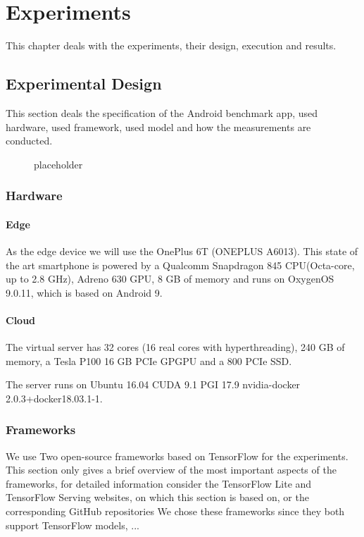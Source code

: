 \chapter{Experiments}
\label{chap:experiments}
This chapter deals with the experiments, their design, execution and results.

 
\section{Experimental Design}
This section deals the specification of the Android benchmark app, used hardware, used framework, used model and how the measurements are conducted. 
\begin{figure}[H]
\centering

\caption{placeholder}
\label{fig:expDesign}
\end{figure}


\subsection{Hardware}
\subsubsection{Edge}
\label{chap:hardwareEdge}
As the edge device we will use the OnePlus 6T (ONEPLUS A6013). This state of the art smartphone is powered by a Qualcomm Snapdragon 845 CPU(Octa-core, up to 2.8 GHz), Adreno 630 GPU, 8 GB of memory and runs on OxygenOS 9.0.11, which is based on Android 9.
\subsubsection{Cloud}
The virtual server has 32 cores (16 real cores with hyperthreading), 240 GB of memory, a Tesla P100 16 GB PCIe GPGPU and a 800 PCIe SSD.

The server runs on Ubuntu 16.04 CUDA 9.1 PGI 17.9 nvidia-docker 2.0.3+docker18.03.1-1.
\subsection{Frameworks}
We use Two open-source frameworks based on TensorFlow for the experiments.
This section only gives a brief overview of the most important aspects of the frameworks, for detailed information consider the TensorFlow Lite\cite{tfLite}  and TensorFlow Serving\cite{tfServing} websites, on which this section is based on, or the corresponding GitHub repositories
We chose these frameworks since they both support TensorFlow models, ...%
